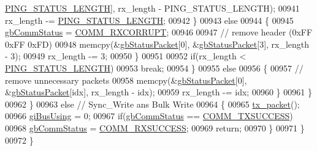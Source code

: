 \begin{DoxyCode}
      \hyperlink{dynamixel_8cpp_aedac6609b233fa877f86b3804204a2fe}{PING\_STATUS\_LENGTH}], rx\_length - PING\_STATUS\_LENGTH);
00941                         rx\_length -= \hyperlink{dynamixel_8cpp_aedac6609b233fa877f86b3804204a2fe}{PING\_STATUS\_LENGTH};
00942                     \}
00943                     \textcolor{keywordflow}{else}
00944                     \{
00945                         \hyperlink{classdynamixel2_a703e327ba8ec5909c238dc94a00cb32d}{gbCommStatus} = \hyperlink{dynamixel_8h_a93c30bd345d8077112f0a3524d26278b}{COMM\_RXCORRUPT};
00946 
00947                         \textcolor{comment}{// remove header (0xFF 0xFF 0xFD)}
00948                         memcpy(&\hyperlink{classdynamixel2_a0776f210a190cf57d1a6faf9697a593d}{gbStatusPacket}[0], &\hyperlink{classdynamixel2_a0776f210a190cf57d1a6faf9697a593d}{gbStatusPacket}[3], 
      rx\_length - 3); 
00949                         rx\_length -= 3;
00950                     \}
00951 
00952                     \textcolor{keywordflow}{if}(rx\_length < \hyperlink{dynamixel_8cpp_aedac6609b233fa877f86b3804204a2fe}{PING\_STATUS\_LENGTH})
00953                         \textcolor{keywordflow}{break};
00954                 \}
00955                 \textcolor{keywordflow}{else}
00956                 \{
00957                     \textcolor{comment}{// remove unnecessary packets}
00958                     memcpy(&\hyperlink{classdynamixel2_a0776f210a190cf57d1a6faf9697a593d}{gbStatusPacket}[0], &\hyperlink{classdynamixel2_a0776f210a190cf57d1a6faf9697a593d}{gbStatusPacket}[idx], rx\_length 
      - idx);
00959                     rx\_length -= idx;
00960                 \}
00961             \}
00962         \}
00963         \textcolor{keywordflow}{else} \textcolor{comment}{// Sync\_Write ans Bulk Write}
00964         \{
00965             \hyperlink{classdynamixel2_a526e395e15fbf50ffbc8ce0853b08233}{tx\_packet}();
00966             \hyperlink{classdynamixel2_a7fc43b4c4b7e36aa8f0420b037658f83}{giBusUsing} = 0;
00967             \textcolor{keywordflow}{if}(\hyperlink{classdynamixel2_a703e327ba8ec5909c238dc94a00cb32d}{gbCommStatus} == \hyperlink{dynamixel_8h_aac6d30f996256b24d311de81eb0f0c1e}{COMM\_TXSUCCESS})
00968                 \hyperlink{classdynamixel2_a703e327ba8ec5909c238dc94a00cb32d}{gbCommStatus} = \hyperlink{dynamixel_8h_a171328d9f298535c18d079f65e631434}{COMM\_RXSUCCESS};
00969             \textcolor{keywordflow}{return};
00970         \}
00971     \}
00972 \}
\end{DoxyCode}
\hypertarget{classdynamixel2_ae511ba1af88cae4f3307d50242491011}{}
